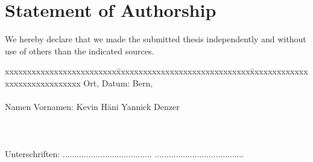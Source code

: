 \chapter*{Statement of Authorship}
\label{chap:selbstaendigkeitserklaerung}

\vspace*{10mm} 

We hereby declare that we made the submitted thesis independently and without use of others than the indicated sources. 

\vspace{15mm}

\begin{tabbing}
xxxxxxxxxxxxxxxxxxxxxxxxx\=xxxxxxxxxxxxxxxxxxxxxxxxxxxxxx\=xxxxxxxxxxxxxxxxxxxxxxxxxxxxxx\kill
Ort, Datum:		\> Bern, \versiondate \\ \\ 
Namen Vornamen:	\> Kevin Häni 	\> Yannick Denzer \\ \\ \\ \\ 
Unterschriften:	\> ......................................\> ...................................... \\
\end{tabbing}
